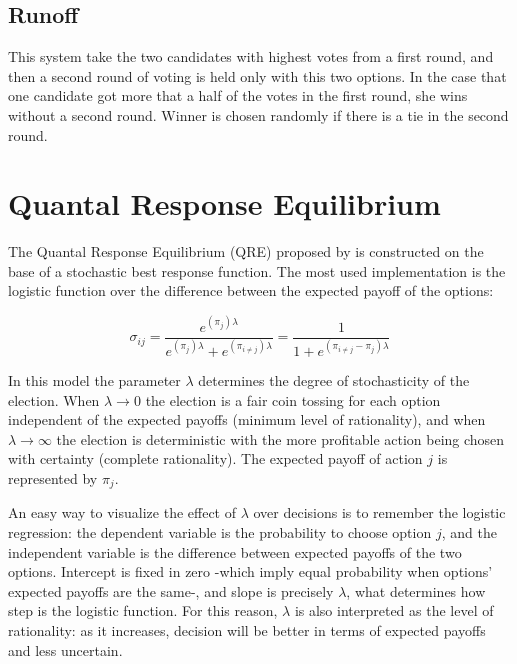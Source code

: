 	\subsection{Runoff}
	This system take the two candidates with highest votes from a first round, and then a second round of voting is held only with this two options. In the case that one candidate got more that a half of the votes in the first round, she wins without a second round. Winner is chosen randomly if there is a tie in the second round.


\section{Quantal Response Equilibrium}

The Quantal Response Equilibrium (QRE) proposed by  is constructed on the base of a stochastic best response function. The most used implementation is the logistic function over the difference between the expected payoff of the options:

\begin{equation}\label{fn:SBR}
\sigma_{ij}= \displaystyle\frac{e^{(\pi_{j})\lambda}}{e^{(\pi_{j})\lambda}+e^{(\pi_{i\ne j})\lambda} } 
		=\displaystyle\frac{1}{1+e^{(\pi_{i\ne j}-\pi_{j})\lambda }}		
\end{equation}

In this model the parameter $\lambda$ determines the degree of stochasticity of the election. When $\lambda \rightarrow 0$ the election is a fair coin tossing for each option independent of the expected payoffs (minimum level of rationality), and when $\lambda \rightarrow  \infty$ the election is deterministic with the more profitable action being chosen with certainty (complete rationality). 
The expected payoff of action $j$ is represented by $\pi_j$.

An easy way to visualize the effect of $\lambda$ over decisions is to remember the logistic regression: the dependent variable is the probability to choose option $j$, and the independent variable is the difference between expected payoffs of the two options. Intercept is fixed in zero -which imply equal probability when options' expected payoffs are the same-, and slope is precisely $\lambda$, what determines how step is the logistic function. 
For this reason, $\lambda$ is also interpreted as the level of rationality: as it increases, decision will be better in terms of expected payoffs and less uncertain.

